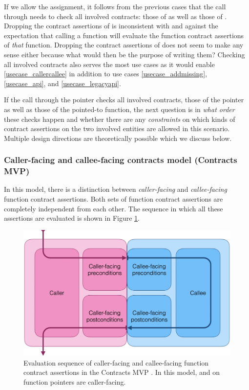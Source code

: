 If we allow the assignment, it follows from the previous cases that the call through  needs to check all involved contracts: those of  as well as those of . Dropping the contract assertions of  is inconsistent with \cite{P2900R8} and against the expectation that calling a function will evaluate the function contract assertions of \emph{that} function. Dropping the contract assertions of  does not seem to make any sense either because what would then be the purpose of writing them? Checking all involved contracts also serves the most use cases as it would enable \ref{usecase_callercallee} in addition to use cases \ref{usecase_addmissing}, \ref{usecase_api}, and \ref{usecase_legacyapi}.

If the call through the pointer checks all involved contracts, those of the pointer as well as those of the pointed-to function, the next question is in \emph{what order} these checks happen and whether there are any \emph{constraints} on which kinds of contract assertions on the two involved entities are allowed in this scenario. Multiple design directions are theoretically possible which we discuss below.

\subsubsection{Caller-facing and callee-facing contracts model (Contracts MVP)}

In this model, there is a distinction between \emph{caller-facing} and \emph{callee-facing} function contract assertions. Both sets of function contract assertions are completely independent from each other. The sequence in which all these assertions are evaluated is shown in Figure \ref{fig:callercallee}.

\begin{figure}[bt]
\begin{center}
\includegraphics[scale=0.29]{images/D2900R9-callercallee}
\end{center}
\caption{Evaluation sequence of caller-facing and callee-facing function contract assertions in the Contracts MVP \cite{P2900R8}. In this model,  and  on function pointers are caller-facing.}
\label{fig:callercallee}
\end{figure}

